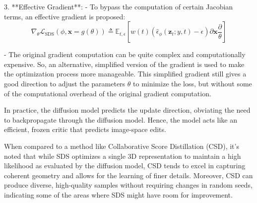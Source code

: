 3. **Effective Gradient**:
   - To bypass the computation of certain Jacobian terms, an effective gradient is proposed:
     \[ \nabla_{\theta}\mathcal{L}_{\text{SDS}}(\phi,\mathbf{x}=g(\theta))\triangleq\mathbb{E}_{t,\epsilon}\left[w(t)\left(\hat{\epsilon}_{\phi}({\mathbf{z}}_{t};y,t)-\epsilon\right){\partial\mathbf{x}\frac\partial\theta}\right] \]

    - The original gradient computation can be quite complex and computationally expensive. So, an alternative, simplified version of the gradient is used to make the optimization process more manageable. This simplified gradient still gives a good direction to adjust the parameters \( \theta \) to minimize the loss, but without some of the computational overhead of the original gradient computation.


In practice, the diffusion model predicts the update direction, obviating the need to backpropagate through the diffusion model. Hence, the model acts like an efficient, frozen critic that predicts image-space edits.

When compared to a method like Collaborative Score Distillation (CSD), it's noted that while SDS optimizes a single 3D representation to maintain a high likelihood as evaluated by the diffusion model, CSD tends to excel in capturing coherent geometry and allows for the learning of finer details. Moreover, CSD can produce diverse, high-quality samples without requiring changes in random seeds, indicating some of the areas where SDS might have room for improvement.

